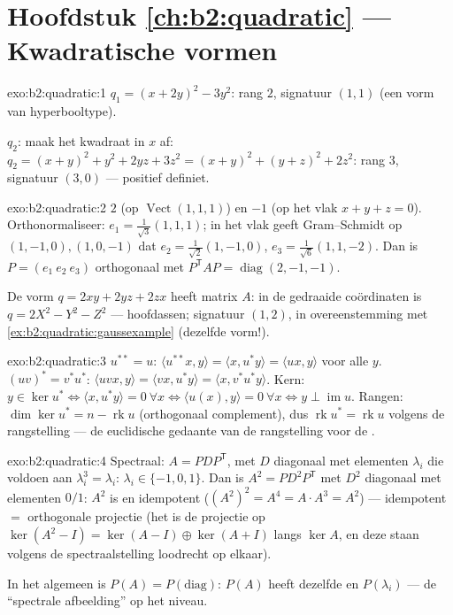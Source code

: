 \section*{Hoofdstuk \ref{ch:b2:quadratic} --- Kwadratische vormen}

\begin{solution}{exo:b2:quadratic:1}
$q_1 = (x + 2y)^2 - 3y^2$: rang $2$, signatuur $(1, 1)$ (een vorm
van hyperbooltype).

$q_2$: maak het kwadraat in $x$ af: $q_2 = (x + y)^2 + y^2 + 2yz +
3z^2 = (x+y)^2 + (y + z)^2 + 2z^2$: rang $3$, signatuur $(3, 0)$
--- positief definiet.
\end{solution}

\begin{solution}{exo:b2:quadratic:2}
 $2$ (op $\operatorname{Vect}(1,1,1)$) en $-1$ (op het
vlak $x + y + z = 0$). Orthonormaliseer: $e_1 =
\frac{1}{\sqrt3}(1,1,1)$; in het vlak geeft Gram--Schmidt op
$(1,-1,0), (1,0,-1)$ dat $e_2 = \frac{1}{\sqrt2}(1,-1,0)$, $e_3 =
\frac{1}{\sqrt6}(1,1,-2)$. Dan is $P = (e_1\ e_2\ e_3)$ orthogonaal
met $P^{\mathsf T}AP = \operatorname{diag}(2,-1,-1)$.

De vorm $q = 2xy + 2yz + 2zx$ heeft matrix $A$: in de gedraaide
coördinaten is $q = 2X^2 - Y^2 - Z^2$ --- hoofdassen; signatuur
$(1,2)$, in overeenstemming met
\cref{ex:b2:quadratic:gaussexample} (dezelfde vorm!).
\end{solution}

\begin{solution}{exo:b2:quadratic:3}
$u^{**} = u$: $\langle u^{**}x, y\rangle = \langle x, u^*y\rangle =
\langle ux, y\rangle$ voor alle $y$. $(uv)^* = v^*u^*$: $\langle
uvx, y\rangle = \langle vx, u^*y\rangle = \langle x,
v^*u^*y\rangle$. Kern: $y \in \ker u^* \iff \langle x, u^*y
\rangle = 0\ \forall x \iff \langle u(x), y\rangle = 0\ \forall x
\iff y \perp \operatorname{im} u$. Rangen: $\dim\ker u^* = n -
\operatorname{rk} u$ (orthogonaal complement), dus
$\operatorname{rk} u^* = \operatorname{rk} u$ volgens de
rangstelling --- de euclidische gedaante van de rangstelling voor
de .
\end{solution}

\begin{solution}{exo:b2:quadratic:4}
Spectraal: $A = PDP^{\mathsf T}$, met $D$ diagonaal met elementen
$\lambda_i$ die voldoen aan $\lambda_i^3 = \lambda_i$: $\lambda_i
\in \{-1, 0, 1\}$. Dan is $A^2 = PD^2P^{\mathsf T}$ met $D^2$
diagonaal met elementen $0/1$: $A^2$ is  en idempotent
($(A^2)^2 = A^4 = A\cdot A^3 = A^2$) ---  idempotent
$=$ orthogonale projectie (het is de projectie op
$\ker(A^2 - I) = \ker(A-I)\oplus\ker(A+I)$ langs $\ker A$, en deze
staan volgens de spectraalstelling loodrecht op elkaar).

In het algemeen is $P(A) = P\!\left(\text{diag}\right)$: $P(A)$
heeft dezelfde  en  $P(\lambda_i)$ --- de
``spectrale afbeelding'' op het  niveau.
\end{solution}


